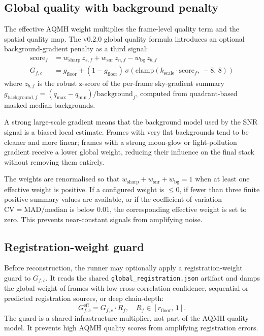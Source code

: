 \documentclass[10pt,twocolumn]{article}
\begin{document}
\subsection{Global quality with background penalty}

The effective AQMH weight multiplies the frame-level quality term and the spatial quality map.
The v0.2.0 global quality formula introduces an optional background-gradient penalty as a third
signal:
\begin{equation}
\begin{split}
  \mathrm{score}_f &= w_{\mathrm{sharp}}\, z_{s,f}
    + w_{\mathrm{snr}}\, z_{n,f}
    - w_{\mathrm{bg}}\, z_{b,f} \\[2pt]
  G_{f,c} &= g_{\mathrm{floor}} + (1 - g_{\mathrm{floor}})\,
    \sigma\!\left(\mathrm{clamp}(k_{\mathrm{scale}} \cdot \mathrm{score}_f,\, -8,\, 8)\right)
\end{split}
\end{equation}
where $z_{b,f}$ is the robust z-score of the per-frame sky-gradient summary
$g_{\mathrm{background},f} = (q_{\max} - q_{\min}) / \mathrm{background}_f$, computed from
quadrant-based masked median backgrounds.

A strong large-scale gradient means that the background model used by the SNR signal is a biased
local estimate. Frames with very flat backgrounds tend to be cleaner and more linear; frames with
a strong moon-glow or light-pollution gradient receive a lower global weight, reducing their
influence on the final stack without removing them entirely.

The weights are renormalised so that $w_{\mathrm{sharp}} + w_{\mathrm{snr}} + w_{\mathrm{bg}} = 1$
when at least one effective weight is positive. If a configured weight is $\le 0$, if fewer than
three finite positive summary values are available, or if the coefficient of variation
$\mathrm{CV} = \mathrm{MAD}/\mathrm{median}$ is below $0.01$, the corresponding effective weight
is set to zero. This prevents near-constant signals from amplifying noise.

\subsection{Registration-weight guard}

Before reconstruction, the runner may optionally apply a registration-weight guard to $G_{f,c}$.
It reads the shared \texttt{global\_registration.json} artifact and damps the global weight of
frames with low cross-correlation confidence, sequential or predicted registration sources, or
deep chain-depth:
\begin{equation}
  G_{f,c}^{\mathrm{eff}} = G_{f,c} \cdot R_f, \quad R_f \in [r_{\mathrm{floor}},\, 1].
\end{equation}
The guard is a shared-infrastructure multiplier, not part of the AQMH quality model. It prevents
high AQMH quality scores from amplifying registration errors.
\end{document}
